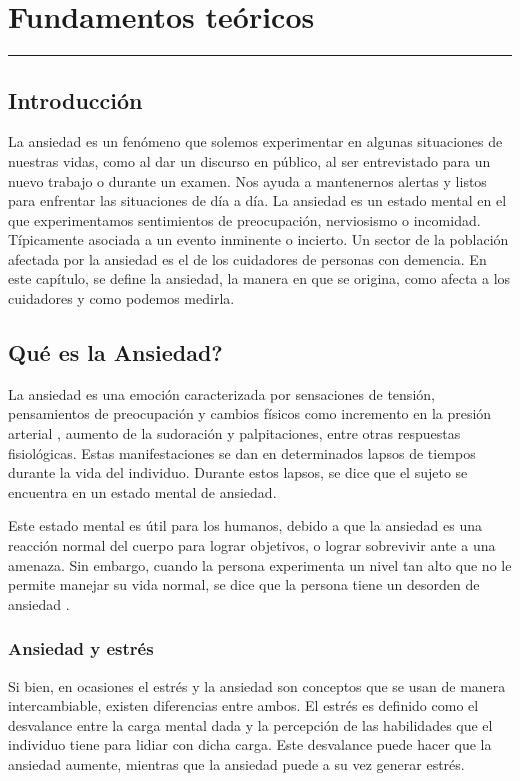 \chapter{Fundamentos te\'oricos}\label{capit:cap2}
\vspace{-2.0325ex}%
\noindent
\rule{\textwidth}{0.5pt}
\vspace{-5.5ex}%
\newcommand{\pushline}{\Indp}%

\section{Introducci\'on}\label{secc:introduccion}
La ansiedad es un fen\'omeno que solemos experimentar en algunas situaciones de nuestras vidas, como  al dar un discurso en p\'ublico, al ser entrevistado para un nuevo trabajo o durante un examen. Nos ayuda a mantenernos alertas y listos para enfrentar las situaciones de d\'ia a d\'ia. La ansiedad es un estado mental en el que experimentamos sentimientos de preocupaci\'on, nerviosismo o incomidad. T\'ipicamente asociada a un evento inminente o incierto. Un sector de la poblaci\'on afectada por la ansiedad es el de los cuidadores de personas con demencia. En este cap\'itulo, se define la ansiedad, la manera en que se origina, como afecta a los cuidadores y como podemos medirla.

\section{Qu\'e es la Ansiedad?}\label{secc:ansiedad}

La ansiedad es una emoci\'on caracterizada por sensaciones de tensi\'on, pensamientos de preocupaci\'on y cambios f\'isicos como incremento en la presi\'on arterial \citep{psychologyapa}, aumento de la sudoraci\'on y palpitaciones, entre otras respuestas fisiol\'ogicas. Estas manifestaciones se dan en determinados lapsos de tiempos durante la vida del individuo. Durante estos lapsos, se dice que el sujeto se encuentra en un estado mental de ansiedad.

Este estado mental es \'util para los humanos, debido a que la ansiedad es una reacci\'on normal del cuerpo para lograr objetivos, o lograr sobrevivir ante a una amenaza. Sin embargo, cuando la persona experimenta un nivel tan alto que no le permite manejar su vida normal, se dice que la persona tiene un desorden de ansiedad \citep{repetto2013}. 

\subsection{Ansiedad y estr\'es}\label{secc:anxietyandstress}
Si bien, en ocasiones el estr\'es y la ansiedad son conceptos que se usan de manera intercambiable, existen diferencias entre ambos. El estr\'es es definido como el desvalance entre la carga mental dada y la percepci\'on de las habilidades que el individuo tiene para lidiar con dicha carga. Este desvalance puede hacer que la ansiedad aumente, mientras que la ansiedad puede a su vez generar estr\'es. %


